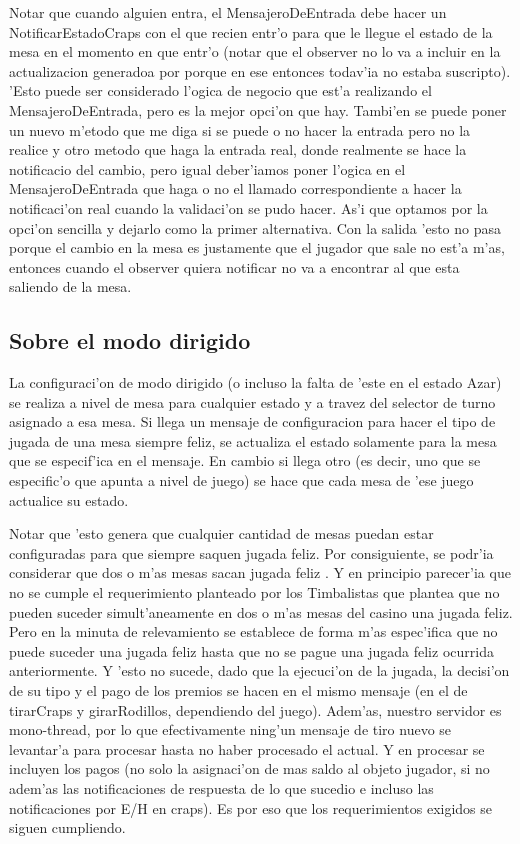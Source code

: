 Notar que cuando alguien entra, el MensajeroDeEntrada debe hacer un NotificarEstadoCraps con el que recien entr'o para que le llegue el estado de la mesa en el momento en que entr'o (notar que el observer no lo va a incluir en la actualizacion generadoa por  porque en ese entonces todav'ia no estaba suscripto). 'Esto puede ser considerado l'ogica de negocio que est'a realizando el MensajeroDeEntrada, pero es la mejor opci'on que hay. Tambi'en se puede poner un nuevo m'etodo que me diga si se puede o no hacer la entrada pero no la realice y otro metodo que haga la entrada real, donde realmente se hace la notificacio del cambio, pero igual deber'iamos poner l'ogica en el MensajeroDeEntrada que haga o no el llamado correspondiente a hacer la notificaci'on real cuando la validaci'on se pudo hacer. As'i que optamos por la opci'on sencilla y dejarlo como la primer alternativa. Con la salida 'esto no pasa porque el cambio en la mesa es justamente que el jugador que sale no est'a m'as, entonces cuando el observer quiera notificar no va a encontrar al que esta saliendo de la mesa.


\subsection{Sobre el modo dirigido}
La configuraci'on de modo dirigido (o incluso la falta de 'este en el estado Azar) se realiza a nivel de mesa para cualquier estado y a travez del selector de turno asignado a esa mesa. Si llega un mensaje de configuracion para hacer el tipo de jugada de una mesa siempre feliz, se actualiza el estado solamente para la mesa que se especif'ica en el mensaje. En cambio si llega otro (es decir, uno que se especific'o que apunta a nivel de juego) se hace que cada mesa de 'ese juego actualice su estado. 

Notar que 'esto genera que cualquier cantidad de mesas puedan estar configuradas para que siempre saquen jugada feliz. Por consiguiente, se podr'ia considerar que dos o m'as mesas sacan jugada feliz . Y en principio parecer'ia que no se cumple el requerimiento planteado por los Timbalistas que plantea que no pueden suceder simult'aneamente en dos o m'as mesas del casino una jugada feliz. Pero en la minuta de relevamiento se establece de forma m'as espec'ifica que no puede suceder una jugada feliz hasta que no se pague una jugada feliz ocurrida anteriormente. Y 'esto no sucede, dado que la ejecuci'on de la jugada, la decisi'on de su tipo y el pago de los premios se hacen en el mismo mensaje (en el de tirarCraps y girarRodillos, dependiendo del juego). Adem'as, nuestro servidor es mono-thread, por lo que efectivamente ning'un mensaje de tiro nuevo se levantar'a para procesar hasta no haber procesado el actual. Y en procesar se incluyen los pagos (no solo la asignaci'on de mas saldo al objeto jugador, si no adem'as las notificaciones de respuesta de lo que sucedio e incluso las notificaciones por E/H en craps). Es por eso que los requerimientos exigidos se siguen cumpliendo.

